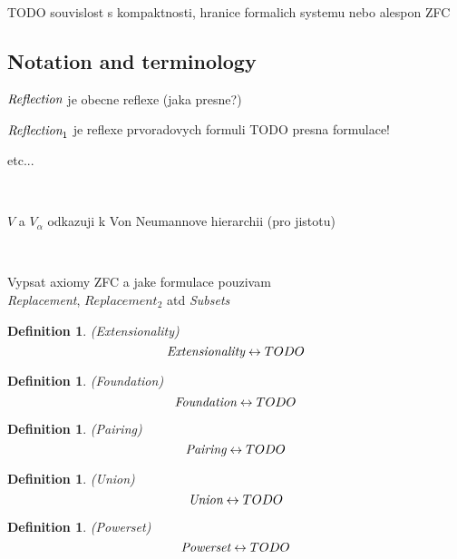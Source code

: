 \documentclass[12pt,a4paper]{article}
\newtheorem{definition}[theorem]{Definition}
\renewcommand{\iff}{\leftrightarrow}
\newcommand{\bce}{\begin{compactenum}}
\newcommand{\ece}{\end{compactenum}}
\begin{document}
TODO souvislost s kompaktnosti, hranice formalich systemu nebo alespon ZFC

\subsection{Notation and terminology}
\bce
\item $\emph{Reflection}$ je obecne reflexe (jaka presne?)
\item $\emph{Reflection}_1$ je reflexe prvoradovych formuli TODO presna formulace!
\item etc...
\ece

\

$V$ a $V_\alpha$ odkazuji k Von Neumannove hierarchii (pro jistotu)

\

Vypsat axiomy ZFC a jake formulace pouzivam\\
\emph{Replacement}, $Replacement_2$ atd
\emph{Subsets}

\begin{definition}{(\emph{Extensionality})}\label{def:extensionality}\\
\begin{equation}
\emph{Extensionality} \iff TODO
\end{equation}
\end{definition}

\begin{definition}{(\emph{Foundation})}\label{def:foundation}\\
\begin{equation}
\emph{Foundation} \iff TODO
\end{equation}
\end{definition}

\begin{definition}{(\emph{Pairing})}\label{def:pairing}\\
\begin{equation}
\emph{Pairing} \iff TODO
\end{equation}
\end{definition}

\begin{definition}{(\emph{Union})}\label{def:union}\\
\begin{equation}
\emph{Union} \iff TODO
\end{equation}
\end{definition}

\begin{definition}{(\emph{Powerset})}\label{def:powerset}\\
\begin{equation}
\emph{Powerset} \iff TODO
\end{equation}
\end{definition}
\end{document}
